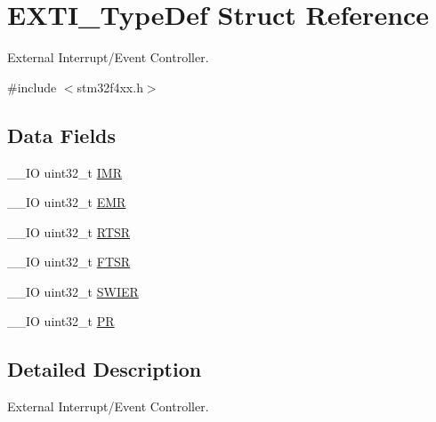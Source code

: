 \hypertarget{struct_e_x_t_i___type_def}{\section{E\-X\-T\-I\-\_\-\-Type\-Def Struct Reference}
\label{struct_e_x_t_i___type_def}
}


External Interrupt/\-Event Controller.  




{\ttfamily \#include $<$stm32f4xx.\-h$>$}

\subsection*{Data Fields}
\begin{DoxyCompactItemize}
\item 
\-\_\-\-\_\-\-I\-O uint32\-\_\-t \hyperlink{struct_e_x_t_i___type_def_ae845b86e973b4bf8a33c447c261633f6}{I\-M\-R}
\item 
\-\_\-\-\_\-\-I\-O uint32\-\_\-t \hyperlink{struct_e_x_t_i___type_def_a6034c7458d8e6030f6dacecf0f1a3a89}{E\-M\-R}
\item 
\-\_\-\-\_\-\-I\-O uint32\-\_\-t \hyperlink{struct_e_x_t_i___type_def_a0d952a17455687d6e9053730d028fa1d}{R\-T\-S\-R}
\item 
\-\_\-\-\_\-\-I\-O uint32\-\_\-t \hyperlink{struct_e_x_t_i___type_def_aa0f7c828c46ae6f6bc9f66f11720bbe6}{F\-T\-S\-R}
\item 
\-\_\-\-\_\-\-I\-O uint32\-\_\-t \hyperlink{struct_e_x_t_i___type_def_a9eae93b6cc13d4d25e12f2224e2369c9}{S\-W\-I\-E\-R}
\item 
\-\_\-\-\_\-\-I\-O uint32\-\_\-t \hyperlink{struct_e_x_t_i___type_def_af8d25514079514d38c104402f46470af}{P\-R}
\end{DoxyCompactItemize}


\subsection{Detailed Description}
External Interrupt/\-Event Controller. 

